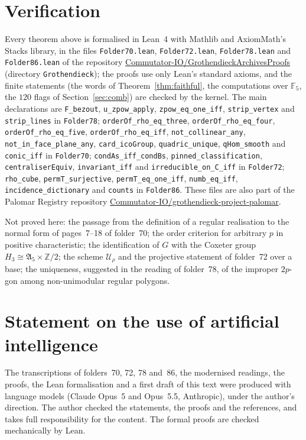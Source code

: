\documentclass[11pt,a4paper]{amsart}
\theoremstyle{definition}
\theoremstyle{remark}
\newcommand{\Z}{\mathbb Z}
\newcommand{\F}{\mathbb F}
\begin{document}
\section{Verification}\label{sec:lean}
\begingroup\sloppy

Every theorem above is formalised in Lean~4 with Mathlib and AxiomMath's Stacks library, in the files \texttt{Folder70.lean}, \texttt{Folder72.lean}, \texttt{Folder78.lean} and \texttt{Folder86.lean} of the repository \href{https://github.com/Commutator-IO/GrothendieckArchivesProofs}{Commutator-IO/GrothendieckArchivesProofs} (directory \texttt{Grothendieck}); the proofs use only Lean's standard axioms, and the finite statements (the words of Theorem~\ref{thm:faithful}, the computations over $\F_5$, the $120$ flags of Section~\ref{sec:comb}) are checked by the kernel. The main declarations are \texttt{F\_bezout}, \texttt{u\_zpow\_apply}, \texttt{zpow\_eq\_one\_iff}, \texttt{strip\_vertex} and \texttt{strip\_lines} in \texttt{Folder78}; \texttt{orderOf\_rho\_eq\_three}, \texttt{orderOf\_rho\_eq\_four}, \texttt{orderOf\_rho\_eq\_five}, \texttt{orderOf\_rho\_eq\_iff}, \texttt{not\_collinear\_any}, \texttt{not\_in\_face\_plane\_any}, \texttt{card\_icoGroup}, \texttt{quadric\_unique}, \texttt{qHom\_smooth} and \texttt{conic\_iff} in \texttt{Folder70}; \texttt{condAs\_iff\_condBs}, \texttt{pinned\_classification}, \texttt{centraliserEquiv}, \texttt{invariant\_iff} and \texttt{irreducible\_on\_C\_iff} in \texttt{Folder72}; \texttt{rho\_cube}, \texttt{permT\_surjective}, \texttt{permT\_eq\_one\_iff}, \texttt{numb\_eq\_iff}, \texttt{incidence\_dictionary} and \texttt{counts} in \texttt{Folder86}. These files are also part of the Palomar Registry repository \href{https://github.com/Commutator-IO/grothendieck-project-palomar}{Commutator-IO/grothendieck-project-palomar}.

\endgroup

Not proved here: the passage from the definition of a regular realisation to the normal form of pages~7--18 of folder~70; the order criterion for arbitrary $p$ in positive characteristic; the identification of $G$ with the Coxeter group $H_3 \cong \mathfrak A_5 \times \Z/2$; the scheme $\mathcal U_\rho$ and the projective statement of folder~72 over a base; the uniqueness, suggested in the reading of folder~78, of the improper $2p$-gon among non-unimodular regular polygons.

\section*{Statement on the use of artificial intelligence}
The transcriptions of folders~70, 72, 78 and~86, the modernised readings, the proofs, the Lean formalisation and a first draft of this text were produced with language models (Claude Opus~5 and Opus~5.5, Anthropic), under the author's direction. The author checked the statements, the proofs and the references, and takes full responsibility for the content. The formal proofs are checked mechanically by Lean.
\end{document}
